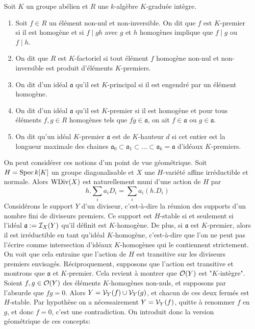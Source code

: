 \begin{defn}
Soit $K$ un groupe abélien et $R$ une $k$-algèbre $K$-graduée intègre.
\begin{enumerate}
\item Soit $f\in R$ un élément non-nul et non-inversible. On dit que $f$ est $K$-premier si il est homogène et si $f\mid gh$ avec $g$ et $h$ homogènes implique que $f\mid g$ ou $f\mid h$.
\item On dit que $R$ est $K$-factoriel si tout élément $f$ homogène non-nul et non-inversible est produit d'éléments $K$-premiers.
\item On dit d'un idéal $\mathfrak{a}$ qu'il est $K$-principal si il est engendré par un élément homogène.
\item On dit d'un idéal $\mathfrak{a}$ qu'il est $K$-premier si il est homogène et pour tous éléments $f,g\in R$ homogènes tels que $fg\in\mathfrak{a}$, on ait $f\in\mathfrak{a}$ ou $g\in\mathfrak{a}$.
\item On dit qu'un idéal $K$-premier $\mathfrak{a}$ est de $K$-hauteur $d$ si cet entier est la longueur maximale des chaines $\mathfrak{a}_0\subset \mathfrak{a}_1\subset ...\subset \mathfrak{a}_k=\mathfrak{a}$ d'idéaux $K$-premiers.
\end{enumerate}
\end{defn}

On peut considérer ces notions d'un point de vue géométrique. Soit $H=\operatorname{Spec} k[K]$ un groupe diagonalisable et $X$ une $H$-variété affine irréductible et normale. Alors $\operatorname{WDiv}(X)$ est naturellement muni d'une action de $H$ par 
$$h.\sum_i a_iD_i=\sum_i a_i(h.D_i)$$
Considérons le support $Y$ d'un diviseur, c'est-à-dire la réunion des supports d'un nombre fini de diviseurs premiers. Ce support est $H$-stable si et seulement si l'idéal $\mathfrak{a}:=\mathcal{I}_X(Y)$ qu'il définit est $K$-homogène. De plus, si $\mathfrak{a}$ est $K$-premier, alors il est irréductible en tant qu'idéal $K$-homogène, c'est-à-dire que l'on ne peut pas l'écrire comme intersection d'idéaux $K$-homogènes qui le contiennent strictement. On voit que cela entraine que l'action de $H$ est transitive sur les diviseurs premiers envisagés. Réciproquement, supposons que l'action est transitive et montrons que $\mathfrak{a}$ et $K$-premier. Cela revient à montrer que $\mathcal{O}(Y)$ est "$K$-intègre". Soient $f,g\in \mathcal{O}(Y)$ des éléments $K$-homogènes non-nuls, et supposons par l'absurde que $fg=0$. Alors $Y=\mathcal{V}_Y(f)\cup\mathcal{V}_Y(g)$, et chacun de ces deux fermés est $H$-stable. Par hypothèse on a nécessairement $Y=\mathcal{V}_Y(f)$, quitte à renommer $f$ en $g$, et donc $f=0$, c'est une contradiction. On introduit donc la version géométrique de ces concepts:

